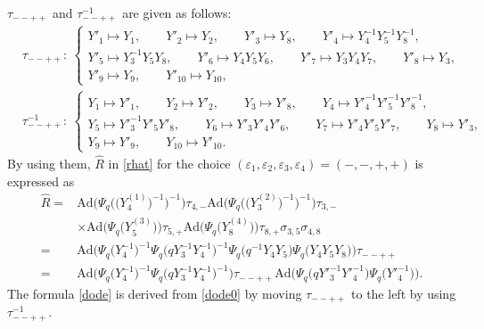 \documentclass[pdftex]{sigma}
\numberwithin{equation}{section}
\begin{document}
\begin{Example}\label{ex:1}
$\tau_{--++}$ and $\tau_{--++}^{-1}$ are given as follows:
\begin{align*}
&\tau_{--++}\colon\
\begin{cases}
Y'_1 \mapsto Y_1,\qquad
Y'_2 \mapsto Y_2, \qquad
Y'_3 \mapsto Y_8, \qquad
Y'_4 \mapsto Y^{-1}_4Y^{-1}_5Y^{-1}_8, \qquad
\\
Y'_5 \mapsto Y^{-1}_3Y_5Y_8, \qquad
Y'_6 \mapsto Y_4 Y_5 Y_6,\qquad
Y'_7 \mapsto Y_3Y_4Y_7,\qquad
Y'_8 \mapsto Y_3,\qquad
\\
Y'_9 \mapsto Y_9, \qquad
Y'_{10} \mapsto Y_{10},
\end{cases}
\\
&\tau_{--++}^{-1}\colon\
\begin{cases}
Y_1 \mapsto Y'_1, \qquad
Y_2 \mapsto Y'_2, \qquad
Y_3 \mapsto Y'_8, \qquad
Y_4 \mapsto Y'^{-1}_4Y'^{-1}_5Y'^{-1}_8,
\\
Y_5 \mapsto Y'^{-1}_3Y'_5Y'_8, \qquad
Y_6 \mapsto Y'_3Y'_4Y'_6, \qquad
Y_7 \mapsto Y'_4Y'_5Y'_7, \qquad
Y_8 \mapsto Y'_3,
\\
Y_9 \mapsto Y'_9, \qquad
Y_{10} \mapsto Y'_{10}.
\end{cases}
\end{align*}
By using them, $\widehat{R}$ in \eqref{rhat} for the choice
$(\varepsilon_1, \varepsilon_2, \varepsilon_3, \varepsilon_4)=(-,-,+,+)$
is expressed as
\begin{align}
\widehat{R}={}&
\mathrm{Ad}\bigl(\Psi_q\bigl(\bigl(Y^{(1)}_4\bigr)^{-1}\bigr)^{-1}\bigr)\tau_{4,-}
\mathrm{Ad}\bigl(\Psi_q\bigl(\bigl(Y^{(2)}_3\bigr)^{-1}\bigr)^{-1}\bigr)\tau_{3,-}
\nonumber \\
& \times
\mathrm{Ad}\bigl(\Psi_q\bigl(Y^{(3)}_5\bigr)\bigr)\tau_{5,+}
 \mathrm{Ad}\bigl(\Psi_q\bigl(Y^{(4)}_8\bigr)\bigr)\tau_{8,+}\sigma_{3,5}\sigma_{4,8}
\nonumber \\
={}&
\mathrm{Ad}\bigl(\Psi_q\bigl(Y_4^{-1}\bigr)^{-1}
\Psi_q\bigl(qY^{-1}_3Y^{-1}_4\bigr)^{-1}
\Psi_q\bigl(q^{-1}Y_4Y_5\bigr)
\Psi_q\bigl(Y_4Y_5Y_8\bigr)\bigr)\tau_{--++}
\label{dode0}\\
={}&
\mathrm{Ad}\bigl(
\Psi_q\bigl(Y_4^{-1}\bigr)^{-1}
\Psi_q\bigl(qY^{-1}_3Y^{-1}_4\bigr)^{-1}\bigr)
\tau_{--++}
\mathrm{Ad}\bigl(
\Psi_q\bigl(qY'^{-1}_3Y'^{-1}_4\bigr)
\Psi_q\bigl(Y'^{-1}_4\bigr)\bigr).
\label{dode}
\end{align}
The formula \eqref{dode} is derived from \eqref{dode0}
by moving $\tau_{--++}$ to the left by using $\tau_{--++}^{-1}$.
\end{Example}
\end{document}
